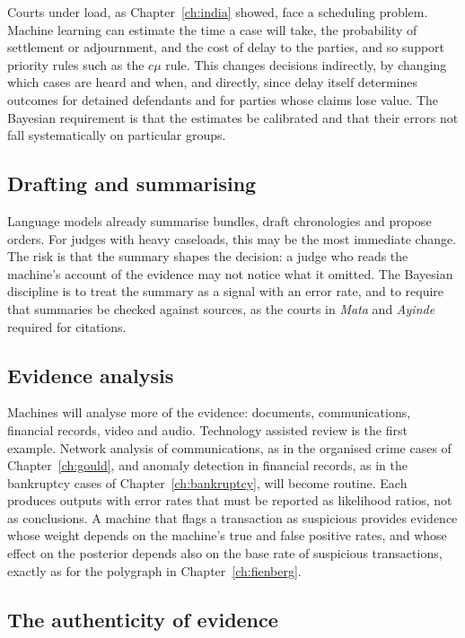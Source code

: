 Courts under load, as Chapter~\ref{ch:india} showed, face a scheduling problem. Machine learning can estimate the time a case will take, the probability of settlement or adjournment, and the cost of delay to the parties, and so support priority rules such as the $c\mu$ rule. This changes decisions indirectly, by changing which cases are heard and when, and directly, since delay itself determines outcomes for detained defendants and for parties whose claims lose value. The Bayesian requirement is that the estimates be calibrated and that their errors not fall systematically on particular groups.

\subsection{Drafting and summarising}

Language models already summarise bundles, draft chronologies and propose orders. For judges with heavy caseloads, this may be the most immediate change. The risk is that the summary shapes the decision: a judge who reads the machine's account of the evidence may not notice what it omitted. The Bayesian discipline is to treat the summary as a signal with an error rate, and to require that summaries be checked against sources, as the courts in \emph{Mata} and \emph{Ayinde} required for citations.

\subsection{Evidence analysis}

Machines will analyse more of the evidence: documents, communications, financial records, video and audio. Technology assisted review is the first example. Network analysis of communications, as in the organised crime cases of Chapter~\ref{ch:gould}, and anomaly detection in financial records, as in the bankruptcy cases of Chapter~\ref{ch:bankruptcy}, will become routine. Each produces outputs with error rates that must be reported as likelihood ratios, not as conclusions. A machine that flags a transaction as suspicious provides evidence whose weight depends on the machine's true and false positive rates, and whose effect on the posterior depends also on the base rate of suspicious transactions, exactly as for the polygraph in Chapter~\ref{ch:fienberg}.

\subsection{The authenticity of evidence}

